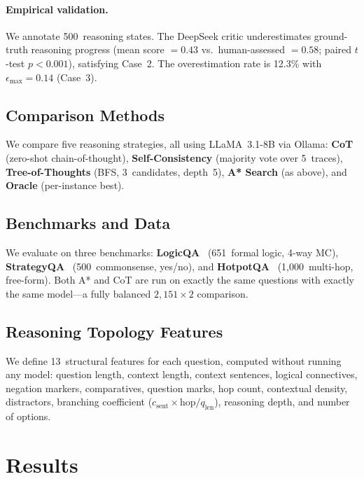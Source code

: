 \documentclass[11pt]{article}
\begin{document}
\paragraph{Empirical validation.}
We annotate 500~reasoning states.  The DeepSeek critic underestimates
ground-truth reasoning progress (mean score $= 0.43$ vs.\ human-assessed
$= 0.58$; paired $t$-test $p < 0.001$), satisfying Case~2.  The
overestimation rate is 12.3\% with $\epsilon_\text{max} = 0.14$ (Case~3).

\subsection{Comparison Methods}
\label{sec:baselines}

We compare five reasoning strategies, all using LLaMA~3.1-8B via Ollama:
\textbf{CoT} (zero-shot chain-of-thought), \textbf{Self-Consistency} (majority
vote over 5~traces), \textbf{Tree-of-Thoughts} (BFS, 3~candidates, depth~5),
\textbf{A* Search} (as above), and \textbf{Oracle} (per-instance best).

\subsection{Benchmarks and Data}
\label{sec:data}

We evaluate on three benchmarks: \textbf{LogicQA}~\citep{liu2020logiqa}
(651~formal logic, 4-way MC), \textbf{StrategyQA}~\citep{geva2021did}
(500~commonsense, yes/no), and \textbf{HotpotQA}~\citep{yang2018hotpotqa}
(1,000~multi-hop, free-form).  Both A* and CoT are run on exactly the same
questions with exactly the same model---a fully balanced $2{,}151 \times 2$
comparison.

\subsection{Reasoning Topology Features}
\label{sec:features}

We define 13~structural features for each question, computed without running
any model: question length, context length, context sentences, logical
connectives, negation markers, comparatives, question marks, hop count,
contextual density, distractors, branching coefficient
($c_\text{sent} \times \mathrm{hop} / q_\text{len}$), reasoning depth, and
number of options.

\section{Results}
\label{sec:results}
\end{document}
